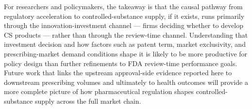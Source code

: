 For researchers and policymakers, the takeaway is that the causal pathway from regulatory acceleration to controlled-substance supply, if it exists, runs primarily through the innovation-investment channel --- firms deciding whether to develop CS products --- rather than through the review-time channel. Understanding that investment decision and how factors such as patent term, market exclusivity, and prescribing-market demand conditions shape it is likely to be more productive for policy design than further refinements to FDA review-time performance goals. Future work that links the upstream approval-side evidence reported here to downstream prescribing volumes and ultimately to health outcomes will provide a more complete picture of how pharmaceutical regulation shapes controlled-substance supply across the full market chain.
